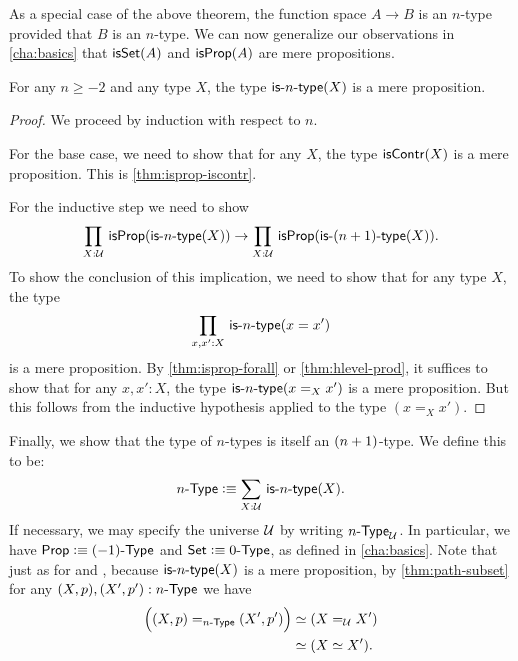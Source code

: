 As a special case of the above theorem, the function space $A \to B$ is an $n$-type provided that $B$ is an $n$-type.
We can now generalize our observations in \cref{cha:basics} that $\isset(A)$ and $\isprop(A)$ are mere propositions.

\begin{thm}\label{thm:isaprop-isofhlevel}
 For any $n \geq -2$ and any type $X$, the type $\istype{n}(X)$ is a mere proposition.
\end{thm}
\begin{proof}
  We proceed by induction with respect to $n$.

 For the base case, we need to show that for any $X$, the type $\iscontr(X)$ is a mere proposition.
 This is \cref{thm:isprop-iscontr}.

For the inductive step we need to show
\[\prd{X : \type} \isprop (\istype{n}(X)) \to \prd{X : \type} \isprop (\istype{\nplusone}(X)). \]
To show the conclusion of this implication, we need to show that for any type $X$, the type
\[\prd{x, x' : X}\istype{n}(x = x')\]
is a mere proposition. By \cref{thm:isprop-forall} or \cref{thm:hlevel-prod}, it suffices to show that for any $x, x' : X$, the type $\istype{n}(x =_X x')$ is a mere
proposition.
But this follows from the inductive hypothesis applied to the type $(x =_X x')$.
\end{proof}

Finally, we show that the type of $n$-types is itself an $\nplusone$-type.
We define this to be:
\[\ntype{n} \defeq \sm{X : \type} \istype{n}(X). \]
If necessary, we may specify the universe $\UU$ by writing $\ntypeU{n}$.
In particular, we have $\prop \defeq \ntype{(-1)}$ and $\set \defeq \ntype{0}$, as defined in \cref{cha:basics}.
Note that just as for \prop and \set, because $\istype{n}(X)$ is a mere proposition, by \cref{thm:path-subset} for any $(X,p), (X',p'):\ntype{n}$ we have
\begin{align*}
  \Big(\id[\ntype{n}]{(X, p)}{(X', p')}\Big) &\eqvsym (\id[\type] X X')\\
  &\eqvsym (\eqv{X}{X'}).
\end{align*}

